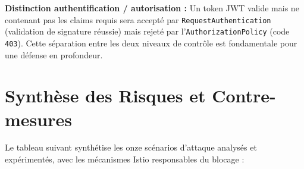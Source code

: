 \medskip\noindent
\textbf{Distinction authentification / autorisation :} Un token JWT valide mais
ne contenant pas les claims requis sera accepté par \texttt{RequestAuthentication}
(validation de signature réussie) mais rejeté par l'\texttt{AuthorizationPolicy}
(code \texttt{403}). Cette séparation entre les deux niveaux de contrôle est
fondamentale pour une défense en profondeur.

\section{Synthèse des Risques et Contre-mesures}

Le tableau suivant synthétise les onze scénarios d'attaque analysés et
expérimentés, avec les mécanismes Istio responsables du blocage :

